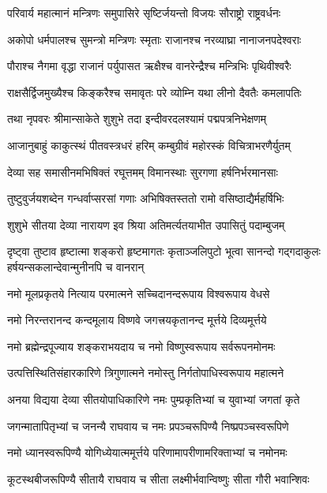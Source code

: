 \twolineshloka
{परिवार्य महात्मानं मन्त्रिणः समुपासिरे}
{सृष्टिर्जयन्तो विजयः सौराष्ट्रो राष्ट्रवर्धनः}%

\twolineshloka
{अकोपो धर्मपालश्च सुमन्त्रो मन्त्रिणः स्मृताः}
{राजानश्च नरव्याघ्रा नानाजनपदेश्वराः}%

\twolineshloka
{पौराश्च नैगमा वृद्धा राजानं पर्युपासत}
{ऋक्षैश्च वानरेन्द्रैश्च मन्त्रिभिः पृथिवीश्वरैः}%

\twolineshloka
{राक्षसैर्द्विजमुख्यैश्च किङ्करैश्च समावृतः}
{परे व्योम्नि यथा लीनो दैवतैः कमलापतिः}%

\twolineshloka
{तथा नृपवरः श्रीमान्साकेते शुशुभे तदा}
{इन्दीवरदलश्यामं पद्मपत्रनिभेक्षणम्}%

\twolineshloka
{आजानुबाहुं काकुत्स्थं पीतवस्त्रधरं हरिम्}
{कम्बुग्रीवं महोरस्कं विचित्राभरणैर्युतम्}%

\twolineshloka
{देव्या सह समासीनमभिषिक्तं रघूत्तमम्}
{विमानस्थाः सुरगणा हर्षनिर्भरमानसाः}%

\twolineshloka
{तुष्टुवुर्जयशब्देन गन्धर्वाप्सरसां गणाः}
{अभिषिक्तस्ततो रामो वसिष्ठाद्यैर्महर्षिभिः}%

\twolineshloka
{शुशुभे सीतया देव्या नारायण इव श्रिया}
{अतिमर्त्यतयाभीत उपासितुं पदाम्बुजम्}%

\threelineshloka
{दृष्ट्वा तुष्टाव हृष्टात्मा शङ्करो हृष्टमागतः}
{कृताञ्जलिपुटो भूत्वा सानन्दो गद्गदाकुलः}
{हर्षयन्सकलान्देवान्मुनीनपि च वानरान्}%


\twolineshloka
{नमो मूलप्रकृतये नित्याय परमात्मने}
{सच्चिदानन्दरूपाय विश्वरूपाय वेधसे}%

\twolineshloka
{नमो निरन्तरानन्द कन्दमूलाय विष्णवे}
{जगत्त्रयकृतानन्द मूर्त्तये दिव्यमूर्त्तये}%

\twolineshloka
{नमो ब्रह्मेन्द्रपूज्याय शङ्कराभयदाय च}
{नमो विष्णुस्वरूपाय सर्वरूपनमोनमः}%

\twolineshloka
{उत्पत्तिस्थितिसंहारकारिणे त्रिगुणात्मने}
{नमोस्तु निर्गतोपाधिस्वरूपाय महात्मने}%

\twolineshloka
{अनया विद्यया देव्या सीतयोपाधिकारिणे}
{नमः पुम्प्रकृतिभ्यां च युवाभ्यां जगतां कृते}%

\twolineshloka
{जगन्मातापितृभ्यां च जनन्यै राघवाय च}
{नमः प्रपञ्चरूपिण्यै निष्प्रपञ्चस्वरूपिणे}%

\twolineshloka
{नमो ध्यानस्वरूपिण्यै योगिध्येयात्ममूर्त्तये}
{परिणामापरीणामरिक्ताभ्यां च नमोनमः}%

\twolineshloka
{कूटस्थबीजरूपिण्यै सीतायै राघवाय च}
{सीता लक्ष्मीर्भवान्विष्णुः सीता गौरी भवान्शिवः}%

